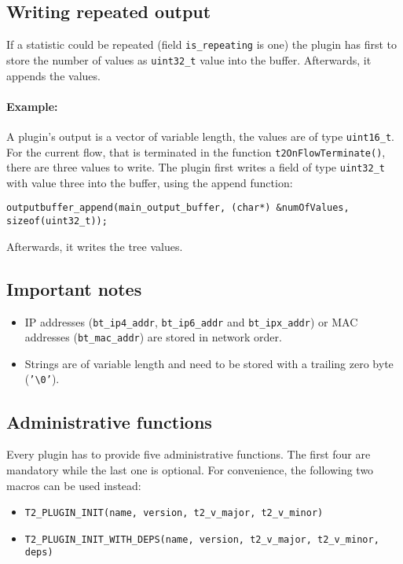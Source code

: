 \documentclass[documentation]{subfiles}
\begin{document}
\subsection{Writing repeated output}
If a statistic could be repeated (field {\tt is\_repeating} is one) the plugin has first to store the number of values as {\tt uint32\_t} value into the buffer. Afterwards, it appends the values.

\paragraph{Example:}
A plugin's output is a vector of variable length, the values are of type {\tt uint16\_t}. For the current flow, that is terminated in the function {\tt t2OnFlowTerminate()}, there are three values to write. The plugin first writes a field of type {\tt uint32\_t} with value three into the buffer, using the append function:
\begin{lstlisting}
outputbuffer_append(main_output_buffer, (char*) &numOfValues, sizeof(uint32_t));
\end{lstlisting}
Afterwards, it writes the tree values.

\subsection{Important notes}
\begin{itemize}
    \item IP addresses ({\tt bt\_ip4\_addr}, {\tt bt\_ip6\_addr} and {\tt bt\_ipx\_addr}) or MAC addresses ({\tt bt\_mac\_addr}) are stored in network order.
    \item Strings are of variable length and need to be stored with a trailing zero byte ({\tt '\textbackslash0'}).
\end{itemize}

\subsection{Administrative functions}
Every plugin has to provide five administrative functions. The first four are mandatory while the last one is optional.
For convenience, the following two macros can be used instead:
\begin{itemize}
    \item {\tt T2\_PLUGIN\_INIT(name, version, t2\_v\_major, t2\_v\_minor)}
    \item {\tt T2\_PLUGIN\_INIT\_WITH\_DEPS(name, version, t2\_v\_major, t2\_v\_minor, deps)}
\end{itemize}
\end{document}
